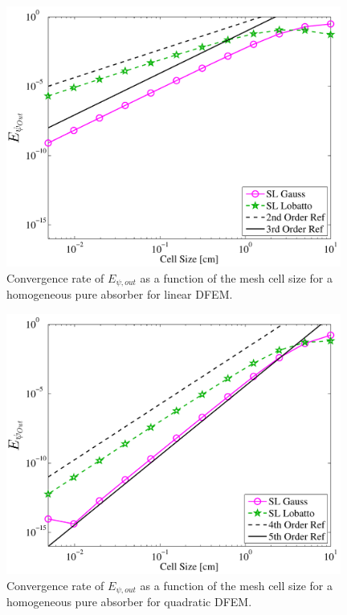 %
%
\begin{figure}[!hbp]
\centering
\includegraphics[width=11cm]{chapter2_constant_xs/Linear_L2Out_err-eps-converted-to.pdf}
\caption{Convergence rate of $E_{\psi,out}$ as a function of the mesh cell size for a homogeneous pure absorber for linear DFEM.}
\label{fig:multi_L2Out_p1}
\end{figure}
\begin{figure}[!htp]
\centering
\includegraphics[width=11cm]{chapter2_constant_xs/Quadratic_L2Out_err-eps-converted-to.pdf}
\caption{Convergence rate of $E_{\psi,out}$ as a function of the mesh cell size for a homogeneous pure absorber for quadratic DFEM.}
\label{fig:multi_L2Out_p2}
\end{figure}

